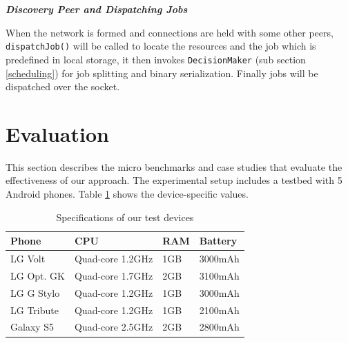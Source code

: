 \documentclass{sig-alternate}[10pt]
\begin{document}
\begin{CCSXML}
\begin{figure}
\end{figure}

\textbf{\emph{Discovery Peer and Dispatching Jobs}}

When the network is formed and connections are held with some other peers, \texttt{dispatchJob()} will be called to locate the resources and the job which is predefined in local storage, it then invokes \texttt{DecisionMaker} (sub section \ref{scheduling}) for job splitting and binary serialization. Finally jobs will be dispatched over the socket.

\begin{figure}
\noindent {}

\end{figure}

\section{Evaluation}
\label{sec:eval}
This section describes the micro benchmarks and case studies that evaluate the effectiveness of our approach. The experimental setup includes a testbed with 5 Android phones. Table \ref{table:devices} shows the device-specific values.

\begin{table}[h]
\caption{Specifications of our test devices}
\label{table:devices}
\centering
\begin{tabular}{| l | l | l | l |}
    \hline
    Phone & CPU & RAM & Battery \\ \hline
    LG Volt & Quad-core 1.2GHz & 1GB & 3000mAh\\ \hline
		LG Opt. GK & Quad-core 1.7GHz & 2GB & 3100mAh\\ \hline
		LG G Stylo & Quad-core 1.2GHz & 1GB & 3000mAh\\ \hline
		LG Tribute & Quad-core 1.2GHz & 1GB & 2100mAh\\ \hline
		Galaxy S5 & Quad-core 2.5GHz & 2GB & 2800mAh\\ \hline
\end{tabular}
\end{table}


\end{CCSXML}
\end{document}
